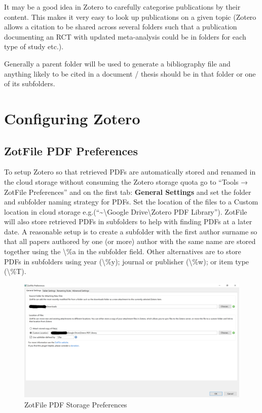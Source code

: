 \documentclass[]{book}
\begin{document}
It may be a good idea in Zotero to carefully categorise publications by their content. This makes it very easy to look up publications on a given topic (Zotero allows a citation to be shared across several folders such that a publication documenting an RCT with updated meta-analysis could be in folders for each type of study etc.).

Generally a parent folder will be used to generate a bibliography file and anything likely to be cited in a document / thesis should be in that folder or one of its subfolders.

\hypertarget{configuring-zotero}{%
\section{Configuring Zotero}\label{configuring-zotero}}

\hypertarget{zotfile-pdf-preferences}{%
\subsection{ZotFile PDF Preferences}\label{zotfile-pdf-preferences}}

To setup Zotero so that retrieved PDFs are automatically stored and renamed in the cloud storage without consuming the Zotero storage quota go to ``Tools → ZotFile Preferences'' and on the first tab: \textbf{General Settings} and set the folder and subfolder naming strategy for PDFs. Set the location of the files to a Custom location in cloud storage e.g.(``\textasciitilde{}\textbackslash{}Google Drive\textbackslash{}Zotero PDF Library''). ZotFile will also store retrieved PDFs in subfolders to help with finding PDFs at a later date. A reasonable setup is to create a subfolder with the first author surname so that all papers authored by one (or more) author with the same name are stored together using the \textbackslash{}\%a in the subfolder field. Other alternatives are to store PDFs in subfolders using year (\textbackslash{}\%y); journal or publisher (\textbackslash{}\%w); or item type (\textbackslash{}\%T).

\begin{figure}
\includegraphics[width=44.44in]{img/zotfile_preferences} \caption{ZotFile PDF Storage Preferences}\label{fig:zotfile-preferences}
\end{figure}
\end{document}
